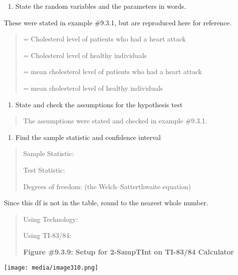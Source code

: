 \documentclass[]{book}
\providecommand{\tightlist}{%
  \setlength{\itemsep}{0pt}\setlength{\parskip}{0pt}}
\begin{document}
\begin{enumerate}
\def\labelenumi{\arabic{enumi}.}
\tightlist
\item
  State the random variables and the parameters in words.
\end{enumerate}

These were stated in example \#9.3.1, but are reproduced here for reference.

\begin{quote}
= Cholesterol level of patients who had a heart attack

= Cholesterol level of healthy individuals

= mean cholesterol level of patients who had a heart attack

= mean cholesterol level of healthy individuals
\end{quote}

\begin{enumerate}
\def\labelenumi{\arabic{enumi}.}
\setcounter{enumi}{1}
\tightlist
\item
  State and check the assumptions for the hypothesis test
\end{enumerate}

\begin{quote}
The assumptions were stated and checked in example \#9.3.1.
\end{quote}

\begin{enumerate}
\def\labelenumi{\arabic{enumi}.}
\setcounter{enumi}{2}
\tightlist
\item
  Find the sample statistic and confidence interval
\end{enumerate}

\begin{quote}
Sample Statistic:

Test Statistic:

Degrees of freedom: (the Welch--Satterthwaite equation)
\end{quote}

Since this df is not in the table, round to the nearest whole number.

\begin{quote}
Using Technology:

Using TI-83/84:

\textbf{Figure \#9.3.9: Setup for 2-SampTInt on TI-83/84 Calculator}
\end{quote}

\texttt{[image: media/image310.png]}
\end{document}
